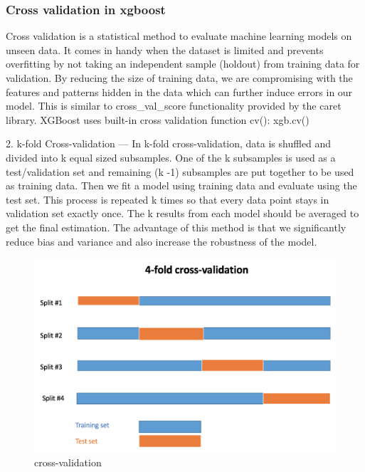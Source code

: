 \subsubsection{Cross validation in xgboost}
Cross validation is a statistical method to evaluate machine learning models on unseen data. It comes in handy when the dataset is limited and prevents overfitting by not taking an independent sample (holdout) from training data for validation. By reducing the size of training data, we are compromising with the features and patterns hidden in the data which can further induce errors in our model. This is similar to cross\_val\_score functionality provided by the caret library. XGBoost uses built-in cross validation function cv():
xgb.cv()\par
2. k-fold Cross-validation — In k-fold cross-validation, data is shuffled and divided into k equal sized subsamples. One of the k subsamples is used as a test/validation set and remaining (k -1) subsamples are put together to be used as training data. Then we fit a model using training data and evaluate using the test set. This process is repeated k times so that every data point stays in validation set exactly once. The k results from each model should be averaged to get the final estimation. The advantage of this method is that we significantly reduce bias and variance and also increase the robustness of the model. 
\begin{figure}[h]
\label{bd}
\centering
\includegraphics[width= 14 cm]{xgb_kfold.png}
\caption{cross-validation}
\end{figure}


